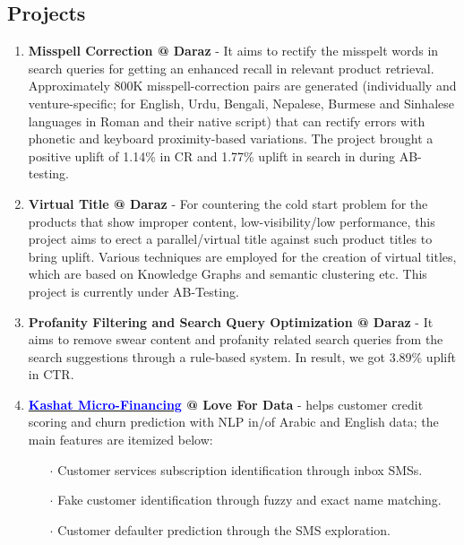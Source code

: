 \documentclass[10pt]{article}
\begin{document}
\subsection*{Projects}
\begin{enumerate}
\itemsep=0em
\item \textbf{Misspell Correction @ Daraz} - It aims to rectify the misspelt words in search queries for getting an enhanced recall in relevant product retrieval. Approximately 800K misspell-correction pairs are generated (individually and venture-specific; for English, Urdu, Bengali, Nepalese, Burmese and Sinhalese languages in Roman and their native script) that can rectify errors with phonetic and keyboard proximity-based variations. The project brought a positive uplift of 1.14\% in CR and 1.77\% uplift in search in during AB-testing.

\item \textbf{Virtual Title @ Daraz} - For countering the cold start problem for the products that show improper content, low-visibility/low performance, this project aims to erect a parallel/virtual title against such product titles to bring uplift. Various techniques are employed for the creation of virtual titles, which are based on Knowledge Graphs and semantic clustering etc. This project is currently under AB-Testing.

\item \textbf{Profanity Filtering and Search Query Optimization @ Daraz} - It aims to remove swear content and profanity related search queries from the search suggestions through a rule-based system. In result, we got 3.89\% uplift in CTR. 

\item \textbf{\href{https://kashat.com.eg/en/}{\textcolor{blue}{Kashat Micro-Financing}} @ Love For Data} - helps {customer credit scoring} and {churn prediction} with NLP in/of {Arabic}
and {English} data; the main features are itemized below:
\vspace{-.5em}
\begin{itemize}
\itemsep = 0em

\item[$\boldsymbol{\cdot}$] Customer {services subscription identification} through inbox SMSs.

\item[$\boldsymbol{\cdot}$] {Fake customer identification} through fuzzy and exact name matching.

\item[$\boldsymbol{\cdot}$] {Customer defaulter prediction} through the SMS exploration.


\end{itemize}
\end{enumerate}
\end{document}
